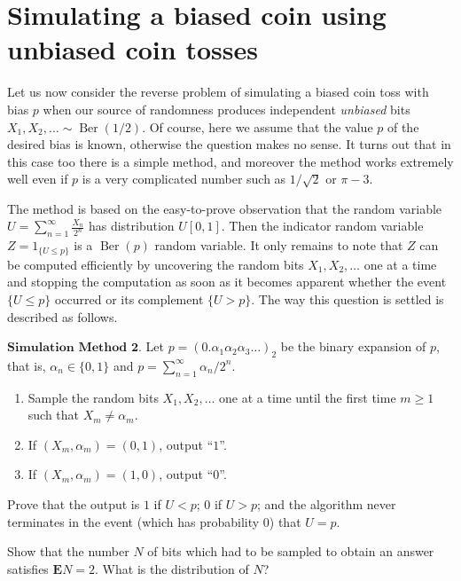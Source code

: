 \section{Simulating a biased coin using unbiased coin tosses}

Let us now consider the reverse problem of simulating
a biased coin toss with bias $p$ when our source of
randomness produces independent \emph{unbiased} bits
$X_1,X_2,\ldots \sim \operatorname{Ber}(1/2)$. Of
course, here we assume that the value $p$ of the
desired bias is known, otherwise the question makes no
sense. It turns out that in this case too there is a
simple method, and moreover the method works extremely
well even if $p$ is a very complicated number such as
$1/\sqrt{2}$ or $\pi-3$.

The method is based on the easy-to-prove observation
that the random variable
$U=\sum_{n=1}^\infty \frac{X_n}{2^n}$ has
distribution $U[0,1]$. Then the indicator random
variable $Z = 1_{\{U\le p\}}$ is a
$\operatorname{Ber}(p)$ random variable. It only
remains to note that $Z$ can be computed efficiently
by uncovering the random bits $X_1,X_2,\ldots$ one at
a time and stopping the computation as soon as it
becomes apparent whether the event $\{U\le p\}$
occurred or its complement $\{U>p\}$. The way this
question is settled is described as follows.

$\textbf{Simulation Method 2.}$ Let
$p=(0.\alpha_1 \alpha_2 \alpha_3 \ldots )_2$ be the
binary expansion of $p$, that is,
$\alpha_n\in \{0,1\}$ and
$p=\sum_{n=1}^\infty \alpha_n/2^{n}$.

\begin{enumerate}[label=\arabic*.]
\item Sample the random bits $X_1,X_2,\ldots$ one at a time
until the first time $m\ge1$ such that
$X_m \neq \alpha_m$.

\item If $(X_m,\alpha_m)=(0,1)$, output ``$1$''.

\item If $(X_m,\alpha_m)=(1,0)$, output ``$0$''.
\end{enumerate}

\begin{xexercise}
Prove that the output is $1$ if $U< p$; $0$ if $U>p$;
and the algorithm never terminates in the event (which
has probability 0) that $U=p$.
\end{xexercise}

\begin{xexercise}
Show that the number $N$ of bits which had to be
sampled to obtain an answer satisfies
$\mathbf{E} N = 2$. What is the distribution of $N$?
\end{xexercise}
